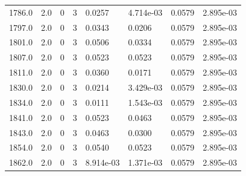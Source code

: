 \documentclass[preview]{standalone}
\begin{document}
{{{{{{{{{{{\begin{tabular}{L{1.2cm}C{1.2cm} C{0.3cm}C{0.5cm} C{1.4cm}C{1.4cm} C{1.4cm}C{1.4cm}}
  1786.0  &   2.0  & 0     &  3 &  0.0257  & 4.714e-03  & 0.0579 &  2.895e-03   \\ 
  1797.0  &   2.0  & 0     &  3 &  0.0343  & 0.0206  & 0.0579 &  2.895e-03   \\ 
  1801.0  &   2.0  & 0     &  3 &  0.0506  & 0.0334  & 0.0579 &  2.895e-03   \\ 
  1807.0  &   2.0  & 0     &  3 &  0.0523  & 0.0523  & 0.0579 &  2.895e-03   \\ 
  1811.0  &   2.0  & 0     &  3 &  0.0360  & 0.0171  & 0.0579 &  2.895e-03   \\ 
  1830.0  &   2.0  & 0     &  3 &  0.0214  & 3.429e-03  & 0.0579 &  2.895e-03   \\ 
  1834.0  &   2.0  & 0     &  3 &  0.0111  & 1.543e-03  & 0.0579 &  2.895e-03   \\ 
  1841.0  &   2.0  & 0     &  3 &  0.0523  & 0.0463  & 0.0579 &  2.895e-03   \\ 
  1843.0  &   2.0  & 0     &  3 &  0.0463  & 0.0300  & 0.0579 &  2.895e-03   \\ 
  1854.0  &   2.0  & 0     &  3 &  0.0540  & 0.0523  & 0.0579 &  2.895e-03   \\ 
  1862.0  &   2.0  & 0     &  3 &  8.914e-03  & 1.371e-03  & 0.0579 &  2.895e-03   \\ 
\hline 
\end{tabular} 

}}}}}}}}}}}
\end{document}
